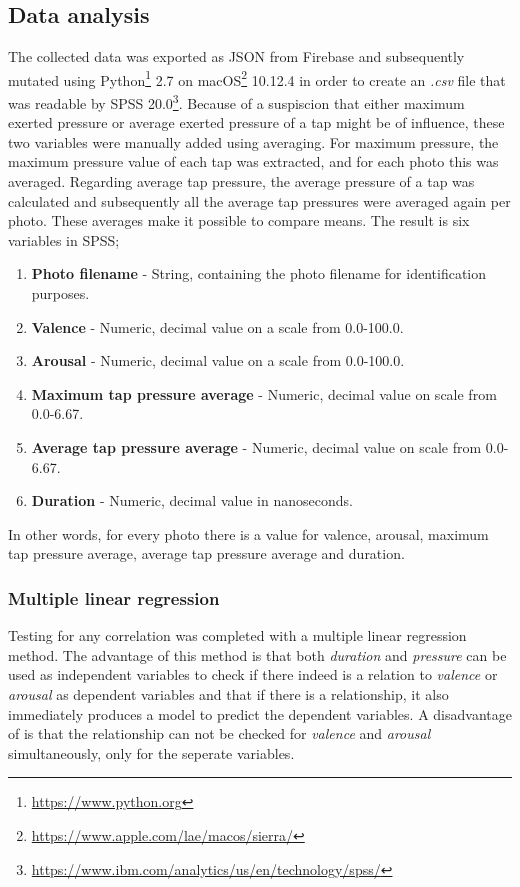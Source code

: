 \documentclass{sigchi}
\begin{document}
\subsection{Data analysis}
\label{sub:data_analysis}
The collected data was exported as JSON from Firebase and subsequently mutated using Python\footnote{\url{https://www.python.org}} 2.7 on macOS\footnote{\url{https://www.apple.com/lae/macos/sierra/}} 10.12.4 in order to create an \textit{.csv} file that was readable by SPSS 20.0\footnote{\url{https://www.ibm.com/analytics/us/en/technology/spss/}}. Because of a suspiscion that either maximum exerted pressure or average exerted pressure of a tap might be of influence, these two variables were manually added using averaging. For maximum pressure, the maximum pressure value of each tap was extracted, and for each photo this was averaged. Regarding average tap pressure, the average pressure of a tap was calculated and subsequently all the average tap pressures were averaged again per photo. These averages make it possible to compare means. The result is six variables in SPSS; 
\begin{enumerate}
  \item \textbf{Photo filename} - String, containing the photo filename for identification purposes.
  \item \textbf{Valence} - Numeric, decimal value on a scale from 0.0-100.0.
  \item \textbf{Arousal} - Numeric, decimal value on a scale from 0.0-100.0.
  \item \textbf{Maximum tap pressure average} - Numeric, decimal value on scale from 0.0-6.67.
  \item \textbf{Average tap pressure average} - Numeric, decimal value on scale from 0.0-6.67.
  \item \textbf{Duration} - Numeric, decimal value in nanoseconds.
\end{enumerate}

In other words, for every photo there is a value for valence, arousal, maximum tap pressure average, average tap pressure average and duration.

\subsubsection{Multiple linear regression}
\label{subsub:multiple_linear_regression}
Testing for any correlation was completed with a multiple linear regression method. The advantage of this method is that both \textit{duration} and \textit{pressure} can be used as independent variables to check if there indeed is a relation to \textit{valence} or \textit{arousal} as dependent variables and that if there is a relationship, it also immediately produces a model to predict the dependent variables. A disadvantage of is that the relationship can not be checked for \textit{valence} and \textit{arousal} simultaneously, only for the seperate variables.
\end{document}
